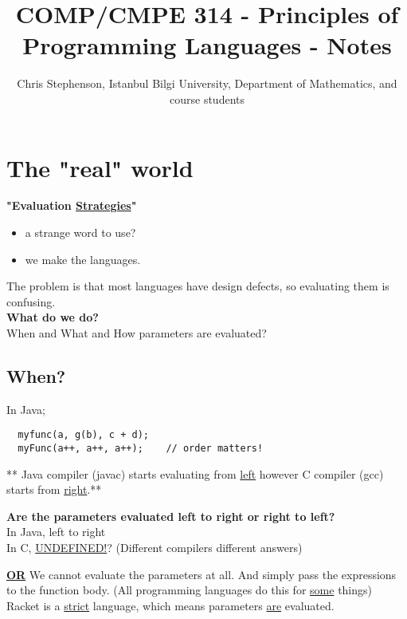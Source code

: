 \documentclass{article}
\begin{document}
\title{COMP/CMPE 314 - Principles of Programming Languages - Notes}
\author{Chris Stephenson, Istanbul Bilgi University, Department of Mathematics, and course students}
\maketitle

\section*{The "real" world}
\begin{flushleft}
\textbf{"Evaluation \underline{Strategies}"}\\
\begin{itemize}
 \item a strange word to use?
 \item we make the languages.
\end{itemize}
The problem is that most languages have design defects, so evaluating them is confusing.\\
\bigskip
\textbf{What do we do?}\\
When and What and How parameters are evaluated?
\end{flushleft}

\subsection{When?}
In Java;
\begin{verbatim}
  myfunc(a, g(b), c + d);
  myFunc(a++, a++, a++);	// order matters!
\end{verbatim}
** Java compiler (javac) starts evaluating from \underline{left} however C compiler (gcc) starts from \underline{right}.**\\
\bigskip

\textbf{Are the parameters evaluated left to right or right to left?}\\
In Java, left to right\\
In C, \underline{UNDEFINED!}? (Different compilers different answers)


\begin{flushleft}
\textbf{\underline{OR}} We cannot evaluate the parameters at all. And simply pass the expressions to the function body. (All programming languages do this for \underline{some} things)\\
Racket is a \underline{strict} language, which means parameters \underline{are} evaluated.
\end{flushleft}
\end{document}
